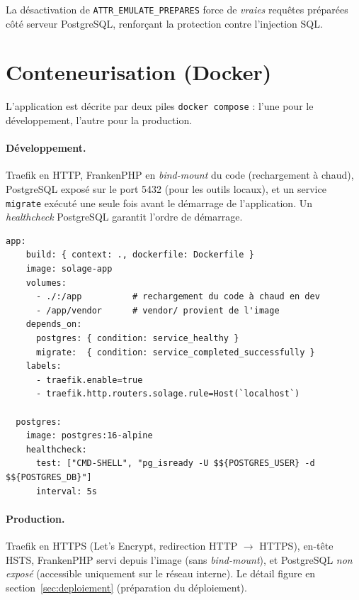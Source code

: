 La désactivation de \texttt{ATTR\_EMULATE\_PREPARES} force de \emph{vraies} requêtes préparées
côté serveur PostgreSQL, renforçant la protection contre l'injection SQL.

\section{Conteneurisation (Docker)}

L'application est décrite par deux piles \texttt{docker compose} : l'une pour le développement,
l'autre pour la production.

\paragraph{Développement.} Traefik en HTTP, FrankenPHP en \emph{bind-mount} du code (rechargement
à chaud), PostgreSQL exposé sur le port 5432 (pour les outils locaux), et un service
\texttt{migrate} exécuté une seule fois avant le démarrage de l'application. Un \emph{healthcheck}
PostgreSQL garantit l'ordre de démarrage.

\begin{lstlisting}[style=yaml, caption={Extrait du \file{docker-compose.yml} (développement) : service applicatif et base}]
  app:
    build: { context: ., dockerfile: Dockerfile }
    image: solage-app
    volumes:
      - ./:/app          # rechargement du code à chaud en dev
      - /app/vendor      # vendor/ provient de l'image
    depends_on:
      postgres: { condition: service_healthy }
      migrate:  { condition: service_completed_successfully }
    labels:
      - traefik.enable=true
      - traefik.http.routers.solage.rule=Host(`localhost`)

  postgres:
    image: postgres:16-alpine
    healthcheck:
      test: ["CMD-SHELL", "pg_isready -U $${POSTGRES_USER} -d $${POSTGRES_DB}"]
      interval: 5s
\end{lstlisting}

\paragraph{Production.} Traefik en HTTPS (Let's Encrypt, redirection HTTP $\to$ HTTPS), en-tête
HSTS, FrankenPHP servi depuis l'image (sans \emph{bind-mount}), et PostgreSQL \emph{non exposé}
(accessible uniquement sur le réseau interne). Le détail figure en
section~\ref{sec:deploiement} (préparation du déploiement).

